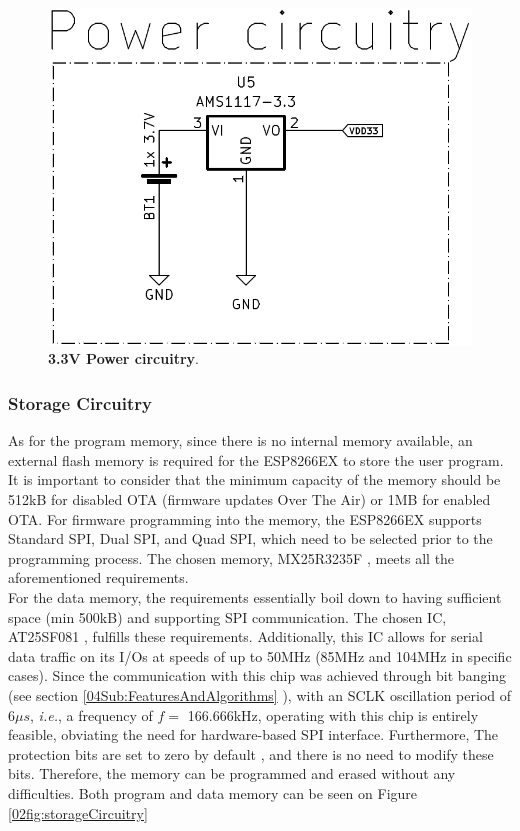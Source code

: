 \begin{figure}[H]
    \centering
    \includegraphics[scale = 0.5]{imagens/powerCircuitry.png}
    \caption{\textbf{3.3V Power circuitry}.}
    \label{02fig:powerCircuitry}
\end{figure}




\subsubsection{Storage Circuitry}\label{02SubSub:StorageCircuitry}

As for the program memory, since there is no internal memory available, an external flash memory is required for the ESP8266EX to store the user 
program. It is important to consider that the minimum capacity of the memory should be 512kB for disabled OTA (firmware updates Over The Air) or 1MB 
for enabled OTA. For firmware programming into the memory, the ESP8266EX supports Standard SPI, Dual SPI, and Quad SPI, which need to be selected prior 
to the programming process. The chosen memory, MX25R3235F \cite{ProgramMemoryMX}, meets all the aforementioned requirements. \\


For the data memory, the requirements essentially boil down to having sufficient space (min 500kB) and supporting SPI communication. The chosen IC, 
AT25SF081 \cite{DataMemoryAT}, fulfills these requirements. Additionally, this IC allows for serial data traffic on its I/Os at speeds of up to 50MHz 
(85MHz and 104MHz in specific cases). Since the communication with this chip was achieved through bit banging (see section \ref{04Sub:FeaturesAndAlgorithms}
), with an SCLK oscillation period of 6$\mu s$, \textit{i.e.}, a frequency of $f = $ 166.666kHz, operating with this chip is entirely feasible, obviating the 
need for hardware-based SPI interface. Furthermore, The protection bits are set to zero by default \cite{DataMemoryAT}, and there is no need to modify these bits. 
Therefore, the memory can be programmed and erased without any difficulties. Both program and data memory can be seen on Figure 
\ref{02fig:storageCircuitry}


